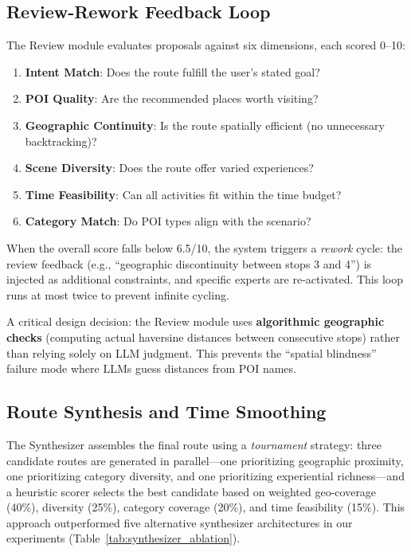 \subsection{Review-Rework Feedback Loop}

The Review module evaluates proposals against six dimensions, each scored 0--10:

\begin{enumerate}[leftmargin=*]
    \item \textbf{Intent Match}: Does the route fulfill the user's stated goal?
    \item \textbf{POI Quality}: Are the recommended places worth visiting?
    \item \textbf{Geographic Continuity}: Is the route spatially efficient (no unnecessary backtracking)?
    \item \textbf{Scene Diversity}: Does the route offer varied experiences?
    \item \textbf{Time Feasibility}: Can all activities fit within the time budget?
    \item \textbf{Category Match}: Do POI types align with the scenario?
\end{enumerate}

When the overall score falls below 6.5/10, the system triggers a \textit{rework} cycle: the review feedback (e.g., ``geographic discontinuity between stops 3 and 4'') is injected as additional constraints, and specific experts are re-activated. This loop runs at most twice to prevent infinite cycling.

A critical design decision: the Review module uses \textbf{algorithmic geographic checks} (computing actual haversine distances between consecutive stops) rather than relying solely on LLM judgment. This prevents the ``spatial blindness'' failure mode where LLMs guess distances from POI names.

\subsection{Route Synthesis and Time Smoothing}

The Synthesizer assembles the final route using a \textit{tournament} strategy: three candidate routes are generated in parallel---one prioritizing geographic proximity, one prioritizing category diversity, and one prioritizing experiential richness---and a heuristic scorer selects the best candidate based on weighted geo-coverage (40\%), diversity (25\%), category coverage (20\%), and time feasibility (15\%). This approach outperformed five alternative synthesizer architectures in our experiments (Table~\ref{tab:synthesizer_ablation}).

